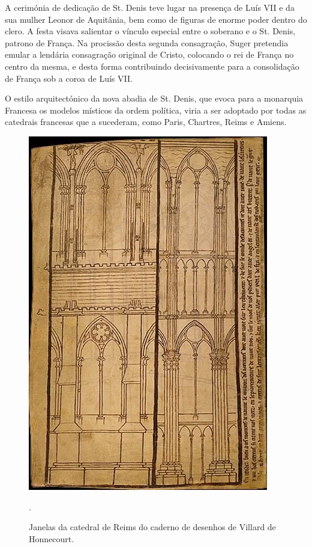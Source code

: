 \documentclass{article}
\begin{document}
A cerimónia de dedicação de St. Denis teve lugar na presença de Luís
VII e da sua mulher Leonor de Aquitânia, bem como de figuras de enorme
poder dentro do clero. A festa visava salientar o vínculo especial
entre o soberano e o St. Denis, patrono de França. Na procissão desta
segunda consagração, Suger pretendia emular a lendária consagração
original de Cristo, colocando o rei de França no centro da mesma, e
desta forma contribuindo decisivamente para a consolidação de França
sob a coroa de Luís VII.

O estilo arquitectónico da nova abadia de St. Denis, que evoca para a
monarquia Francesa os modelos místicos da ordem política, viria a ser
adoptado por todas as catedrais francesas que a sucederam, como Paris,
Chartres, Reims e Amiens.

\begin{figure}
\centering\includegraphics[height=0.6\textheight,keepaspectratio]
                          {images/villard-reims.jpg}
  \caption{Janelas da catedral de Reims do caderno de desenhos de
    Villard de Honnecourt.}.
  \label{fig:2}
\end{figure}
\end{document}
